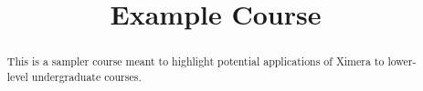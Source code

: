 \documentclass{xourse}
\title{Example Course}%
\begin{document}
      
\begin{abstract} %
This is a sampler course meant to highlight potential applications of Ximera to lower-level undergraduate courses.      
\end{abstract}
      
\maketitle
      

      

      


      
\end{document}

